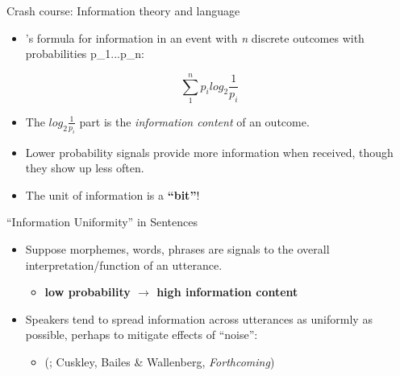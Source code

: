 \documentclass[hyperref={pdfpagelabels=false}]{beamer}
\begin{document}
\begin{frame}{Crash course: Information theory and language} 
	\begin{itemize}
		\item \citet{shannon1948}'s formula for information in an event with \textsl{n} discrete outcomes with probabilities p_1...p_n:
	\end{itemize}
	\begin{center}
		$$\sum_{1}^{n} p_i log_2 \frac{1}{p_i}$$
	\end{center}
	\begin{itemize}
		\item The $log_2 \frac{1}{p_i}$ part is the \textsl{information content} of an outcome.
		\item Lower probability signals provide more information when received, though they show up less often.
		\item The unit of information is a \textbf{``bit''}!
	\end{itemize}
	
\end{frame}


\begin{frame}{``Information Uniformity'' in Sentences} 
\begin{itemize}
	\item Suppose morphemes, words, phrases are signals to the overall interpretation/function of an utterance.\\\vspace{5mm}
	\begin{itemize} \item[] \textbf{low probability $\rightarrow$ high information content}\pause\\\vspace{5mm}  \end{itemize}
	\item Speakers tend to spread information across utterances as uniformly as possible, perhaps to mitigate effects of ``noise'':\\ \begin{itemize}
		\item[] \footnotesize{(\citealt{fenkfenk1980,aylettturk2004,levyjaeger2007}; Cuskley, Bailes \& Wallenberg, \textsl{Forthcoming})}\nocite{cuskleyWallenberg2021}
	\end{itemize}
\end{itemize}



\end{frame}
\end{document}
